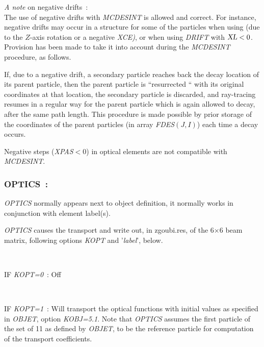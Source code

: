 {\noindent \textsl {A  note}  on negative drifts~: \\
The use  of  negative  drifts  with  \textsl{MCDESINT}  is  allowed 
and correct. 
For instance,  negative drifts  may  occur  in  a  structure   for 
some  of  the  particles  when  using  \CHANGREF{} (due to  the  $ Z$-axis 
rotation  or  a negative  \textsl{XCE)},  or  when  using  \textsl{DRIFT}  with 
$\textsl{XL}<0$. 
Provision  has  been  made  to  take  it  into  account during  the \textsl{MCDESINT}
 procedure,  as follows. 

\noindent If, due   to  a  negative  drift,   a  secondary  particle  reaches 
back the  decay location of its parent particle, then 
the parent  particle  is  ``resurrected `` with its original coordinates 
at  that  location, the   secondary   particle   is   discarded, and 
ray-tracing  resumes  in  a  regular way  for the parent  particle which  
is again allowed to decay,  after  the  same path length. This  procedure  is made 
possible  by  prior storage  of  the  coordinates of the parent  
particles (in array \textsl{FDES}$(J,I)$) each  time  a  decay  occurs. 

\noindent Negative steps (\textsl{XPAS}$<0$) in
optical elements are not compatible with  \textsl{MCDESINT}.  







\newpage

\subsubsection{OPTICS~: \OPTICSTitl} \label{OPTICS} 

\medskip

\textsl{OPTICS}  normally appears next to object definition, it normally works in conjunction with 
element label(s). 

\noindent \textsl{OPTICS}  causes the transport and  write out, in zgoubi.res, of the 6$\times$6 beam matrix, 
following options \textsl{KOPT} and '\textsl{label}', below. 

~

\noindent IF \textsl{KOPT=0}~: Off

~

\noindent IF \textsl{KOPT=1}~: Will transport the optical functions with initial values as specified in \textsl{OBJET}, option 
 \textsl{KOBJ=5.1}. Note that \textsl{OPTICS} assumes the first particle of the set of 11 as defined by \textsl{OBJET},
 to be the reference particle for computation of the transport coefficients. 


}
